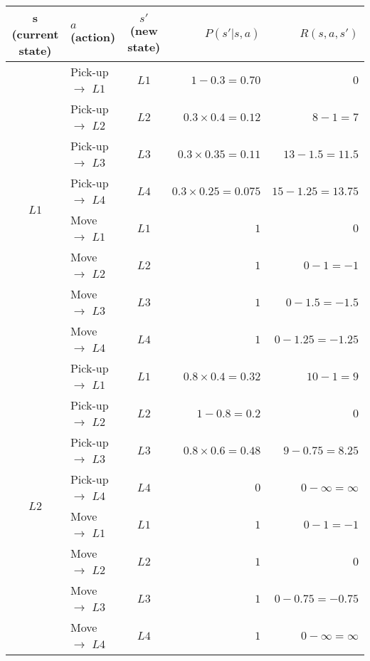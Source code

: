 \documentclass[12pt, letterpaper]{article}
\begin{document}
\begin{center}
    \begin{tabular}{|c|l|c|r|r|}
    \hline
    s (current state)       &$a$ (action) & $s'$ (new state) & $P(s'|s,a)$ & $R(s,a,s')$ 
    \\ \hline
    \multirow{8}{*}{$L1$}   & Pick-up $\rightarrow$ $L1$ & $L1$ & $1-0.3=0.70$ & $0$ \\ \cline{2-5} 
                            & Pick-up $\rightarrow$ $L2$ & $L2$ & $0.3\times 0.4=0.12$ & $8-1=7$ \\ \cline{2-5} 
                            & Pick-up $\rightarrow$ $L3$ & $L3$ & $0.3\times 0.35=0.11$ & $13-1.5=11.5$ \\ \cline{2-5} 
                            & Pick-up $\rightarrow$ $L4$ & $L4$ & $0.3\times 0.25=0.075$ & $15-1.25=13.75$ \\ \cline{2-5}
                            & Move $\rightarrow$ $L1$ & $L1$ & $1$ & $0$ \\ \cline{2-5}
                            & Move $\rightarrow$ $L2$ & $L2$ & $1$ & $0-1=-1$ \\ \cline{2-5}
                            & Move $\rightarrow$ $L3$ & $L3$ & $1$ & $0-1.5=-1.5$ \\ \cline{2-5}
                            & Move $\rightarrow$ $L4$ & $L4$ & $1$ & $0-1.25=-1.25$ \\ \cline{2-5}
    \hline           
    \multirow{8}{*}{$L2$}   & Pick-up $\rightarrow$ $L1$ & $L1$ & $0.8\times0.4=0.32$ & $10-1=9$ \\ \cline{2-5}
                            & Pick-up $\rightarrow$ $L2$ & $L2$ & $1-0.8=0.2$ & $0$ \\ \cline{2-5} 
                            & Pick-up $\rightarrow$ $L3$ & $L3$ & $0.8\times 0.6=0.48$ & $9-0.75=8.25$ \\ \cline{2-5} 
                            & Pick-up $\rightarrow$ $L4$ & $L4$ & $0$ & $0-\infty=\infty$ \\ \cline{2-5}
                            & Move $\rightarrow$ $L1$ & $L1$ & $1$ & $0-1=-1$ \\ \cline{2-5}
                            & Move $\rightarrow$ $L2$ & $L2$ & $1$ & $0$ \\ \cline{2-5}
                            & Move $\rightarrow$ $L3$ & $L3$ & $1$ & $0-0.75=-0.75$ \\ \cline{2-5}
                            & Move $\rightarrow$ $L4$ & $L4$ & $1$ & $0-\infty=\infty$ \\ \cline{2-5}
    \hline

\end{tabular}
\end{center}
\end{document}

